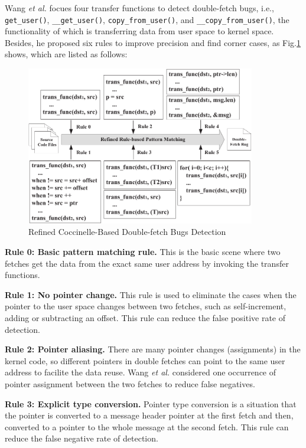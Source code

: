 \documentclass[10pt]{llncs}
\begin{document}
Wang \textit{et al.} focues four transfer functions to detect double-fetch bugs, i.e., \verb:get_user():, \verb:__get_user():, \verb:copy_from_user():, and \verb:__copy_from_user():, the functionality of which is transferring data from user space to kernel space. Besides, he proposed six rules to improve precision and find corner cases, as Fig.\ref{Cocci} shows, which are listed as follows:


\begin{figure}
  \centering
  \includegraphics[width=10cm]{refined}
  \caption{Refined Coccinelle-Based Double-fetch Bugs Detection~\cite{wang}}
  \label{Cocci}
\end{figure}


\textbf{Rule 0: Basic pattern matching rule.}
This is the basic scene where two fetches get the data from the exact same user address by invoking the transfer functions. %

\textbf{Rule 1: No pointer change.}
This rule is used to eliminate the cases when the pointer to the user space changes between two fetches, such as self-increment, adding or subtracting an offset. This rule can reduce the false positive rate of detection.

\textbf{Rule 2: Pointer aliasing.}
There are many pointer changes (assignments) in the kernel code, so different pointers in double fetches can point to the same user address to facilite the data reuse. Wang \textit{et al.} considered one occurrence of pointer assignment between the two fetches to reduce false negatives.

\textbf{Rule 3: Explicit type conversion.}
Pointer type conversion is a situation that the pointer is converted to a message header pointer at the first fetch and then, converted to a pointer to the whole message at the second fetch. This rule can reduce the false negative rate of detection.
\end{document}
